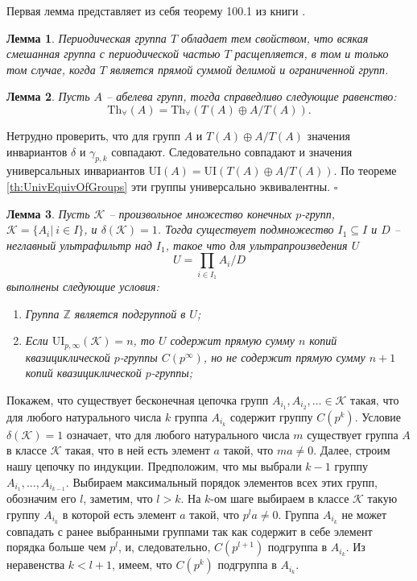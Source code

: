 \documentclass[a4paper,11pt,twoside]{article}
\newtheorem{lemma}{Лемма}[section]
\def\proof{{\noindent{\bf Доказательство.}} }
\def\K{{\mathcal{K}}}
\def\Z{{\mathbb{Z}}}
\def\Tha{{\mathrm{Th}_\forall}}
\def\ui{{\mathrm{UI}}}
\begin{document}
Первая лемма представляет из себя теорему 100.1 из книги \cite{Fuchs}.

\begin{lemma}{\cite{Fuchs}}\label{lemma:Fuchs}
Периодическая группа $T$ обладает тем свойством, что всякая смешанная группа с периодической частью $T$ расщепляется, в том и только том случае, когда $T$ является прямой суммой делимой и ограниченной групп.
\end{lemma}

\begin{lemma}\label{lemma:UnivEquivATA}
Пусть $A$ -- абелева групп, тогда справедливо следующие равенство:
$$\Tha(A) = \Tha(T(A) \oplus A \big/ T(A)).$$
\end{lemma}

\proof Нетрудно проверить, что для групп $A$ и $T(A) \oplus A \big/ T(A)$ значения инвариантов $\delta$ и $\gamma_{p,k}$ совпадают. Следовательно совпадают и значения универсальных инвариантов $\ui(A) = \ui(T(A) \oplus A \big/ T(A))$. По теореме \ref{th:UnivEquivOfGroups} эти группы универсально эквивалентны. $\square$

\begin{lemma}\label{lemma:delta1UltraProduct}
Пусть $\K$ -- произвольное множество конечных $p$-групп, $\K = \{A_i | \ i \in I\}$, и $\delta(\K) = 1$. Тогда существует подмножество $I_1 \subseteq I$ и $D$ -- неглавный ультрафильтр над $I_1$, такое что для ультрапроизведения $U$
$$U = \prod_{i \in I_1} A_i \Big/ D$$
выполнены следующие условия:
\begin{enumerate}
\item Группа $\Z$ является подгруппой в $U$;
\item Если $\ui_{p,\infty}(\K) = n$, то $U$ содержит прямую сумму $n$ копий квазициклической $p$-группы $C(p^\infty)$, но не содержит прямую сумму $n+1$ копий квазициклической $p$-группы;
\end{enumerate}
\end{lemma}

\proof Покажем, что существует бесконечная цепочка групп $A_{i_1}, A_{i_2}, \ldots \in \K$ такая, что для любого натурального числа $k$ группа $A_{i_k}$ содержит группу $C(p^k)$. Условие $\delta(\K) = 1$ означает, что для любого натурального числа $m$ существует группа $A$ в классе $\K$ такая, что в ней есть элемент $a$ такой, что $ma \neq 0$. Далее, строим нашу цепочку по индукции. Предположим, что мы выбрали $k-1$ группу $A_{i_1}, \ldots, A_{i_{k-1}}$. Выбираем максимальный порядок элементов всех этих групп, обозначим его $l$, заметим, что $l > k$. На $k$-ом шаге выбираем в классе $\K$ такую группу $A_{i_k}$ в которой есть элемент $a$ такой, что $p^{l} a \neq 0$. Группа $A_{i_k}$ не может совпадать с ранее выбранными группами так как содержит в себе элемент порядка больше чем $p^l$, и, следовательно, $C(p^{l+1})$ подгруппа в $A_{i_k}$. Из неравенства $k < l+1$, имеем, что $C(p^k)$ подгруппа в $A_{i_k}$.
\end{document}
